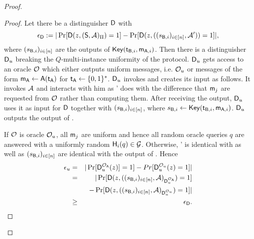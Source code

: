 \begin{proof}
\begin{proof}
Let there be a distinguisher $\mathsf D$ with
$$
\epsilon_{\mathsf D}:=|\Pr[\mathsf D(z,(\mathsf{S}, \mathcal{A})_{\Pi})=1] -\Pr[\mathsf D(z,((s_{\mathsf{B},i})_{i\in[n]},\mathcal{A}'))=1]|,
$$
where $(s_{\mathsf{B},i})_{i\in[n]}$ are the outputs of $\mathsf{Key}(\mathsf{t}_{\mathsf{B},i},\mathsf{m}_{\mathsf{A},i})$. Then there is a distinguisher $\mathsf D_u$ breaking the $Q$-multi-instance uniformity of the \UKA protocol. $\mathsf D_u$ gets access to an oracle $\mathcal{O}$ which either outputs uniform messages, i.e. $\mathcal{O}_u$ or messages of  the form $\mathsf{m}_\mathsf{A}\leftarrow\mathsf{A}(\mathsf{t}_\mathsf{A})$ for $\mathsf{t}_\mathsf{A}\leftarrow\{0,1\}^*$. $\mathsf D_u$ invokes \D and creates its input as follows. It invokes $\mathcal{A}$ and interacts with him as \Adv' does with the difference that $\mathsf{m}_j$ are requested from $\mathcal{O}$ rather than computing them.  After receiving the output, $\mathsf D_u$ uses it as input for $\mathsf D$ together with $(s_{\mathsf{B},i})_{i\in[n]}$, where $s_{\mathsf{B},i}\leftarrow\mathsf{Key}(\mathsf{t}_{\mathsf{B},i},\mathsf{m}_{\mathsf{A},i})$. $\mathsf D_u$ outputs the output of \D. 

If $\mathcal{O}$ is oracle $\mathcal{O}_{u}$, all $\mathsf{m}_j$ are uniform and hence all random oracle queries $q$ are answered with a uniformly random $\mathsf{H}_i(q)\in\mathcal{G}$.  Otherwise, \Adv' is identical with \send as well as $(s_{\mathsf{B},i})_{i\in[n]}$ are identical with the output of \send.  
Hence 
\begin{eqnarray*}
\epsilon_{u}&=&|\Pr[\mathsf D_u^{\mathcal{O}_{\mathsf{A}}}(z)]=1]-Pr[\mathsf D_u^{\mathcal{O}_{u}}(z)=1]|\\
&= &|\Pr[\mathsf D(z,((s_{\mathsf{B},i})_{i\in[n]},\mathcal{A})_{\mathsf D_u^{\mathcal{O}_{\mathsf{A}}}})=1]\\
&&-\Pr[\mathsf D(z,((s_{\mathsf{B},i})_{i\in[n]},\mathcal{A})_{\mathsf D_u^{\mathcal{O}_{u}}})=1]|\\
&\geq&\epsilon_{\mathsf D}.
\end{eqnarray*}




\end{proof}
\end{proof}

